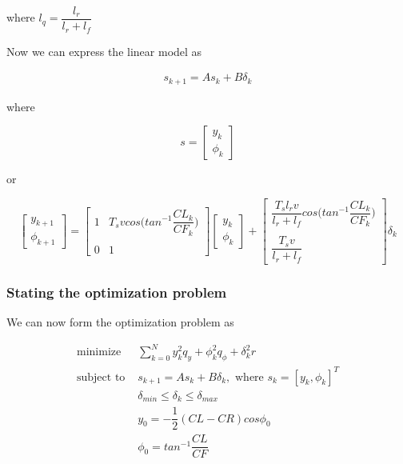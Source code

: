 \documentclass[oneside,12pt]{article}
\begin{document}
    where $l_q = \dfrac{l_r}{l_r + l_f}$




  Now we can express the linear model as

    \begin{align}
      s_{k+1} = A s_k + B \delta_k
    \end{align}

    where

    \begin{equation}
      s=
      \begin{bmatrix}
        y_{k} \\
        \phi_{k}
      \end{bmatrix}
    \end{equation}

    or

    \begin{equation}
      \begin{bmatrix}
        y_{k+1} \\
        \phi_{k+1}
      \end{bmatrix}
      =
      \begin{bmatrix}
        1 & T_s v cos\Big(tan^{-1}\dfrac{CL_k}{CF_k}\Big) \\\\
        0 & 1
      \end{bmatrix}
      \begin{bmatrix}
        y_{k} \\
        \phi_{k}
      \end{bmatrix}
      +
      \begin{bmatrix}
        \dfrac{T_s l_r v}{l_r + l_f} cos\Big(tan^{-1}\dfrac{CL_k}{CF_k}\Big) \\\\
        \dfrac{T_s v}{l_r+l_f}
      \end{bmatrix}
      \delta_{k}
    \end{equation}

    \subsubsection{Stating the optimization problem}

    We can now form the optimization problem as

    \begin{align}
      \text{minimize }    & \sum\limits_{k=0}^N y_k^2 q_y + \phi_k^2 q_{\phi} + \delta_k^2 r \\
      \text{subject to }  & s_{k+1} = A s_k + B \delta_k,\text{ where } s_k = [y_k, \phi_k]^T \\
                          & \delta_{min} \leq \delta_k \leq \delta_{max} \\
                          & y_0 = -\dfrac{1}{2}(CL-CR)cos\phi_0 \\
                          & \phi_0 = tan^{-1}\dfrac{CL}{CF}
    \end{align}
\end{document}
